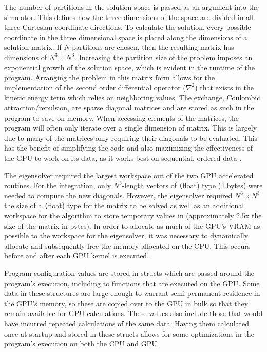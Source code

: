 \documentclass[conference, twoside]{IEEEtran}
\begin{document}
The number of partitions in the solution space is passed as an argument into the simulator. This defines how the three dimensions of the space are divided in all three Cartesian coordinate directions. To calculate the solution, every possible coordinate in the three dimensional space is placed along the dimensions of a solution matrix. If $N$ partitions are chosen, then the resulting matrix has dimensions of $N^3 \times N^3$. Increasing the partition size of the problem imposes an exponential growth of the solution space, which is evident in the runtime of the program. Arranging the problem in this matrix form allows for the implementation of the second order differential operator ($\nabla^2$) that exists in the kinetic energy term which relies on neighboring values. The exchange, Coulombic attraction/repulsion, are sparse diagonal matrices and are stored as such in the program to save on memory. When accessing elements of the matrices, the program will often only iterate over a single dimension of matrix. This is largely due to many of the matrices only requiring their diagonals to be evaluated. This has the benefit of simplifying the code and also maximizing the effectiveness of the GPU to work on its data, as it works best on sequential, ordered data \cite{special-purpose-hf-computer}.

The eigensolver required the largest workspace out of the two GPU accelerated routines. For the integration, only $N^3$-length vectors of \texttt(float) type (4 bytes) were needed to compute the new diagonals. However, the eigensolver required $N^3 \times N^3$ the size of a \texttt(float) type for the matrix to be solved as well as an additional workspace for the algorithm to store temporary values in (approximately 2.5x the size of the matrix in bytes). In order to allocate as much of the GPU's VRAM as possible to the workspace for the eigensolver, it was necessary to dynamically allocate and subsequently free the memory allocated on the CPU. This occurs before and after each GPU kernel is executed.

Program configuration values are stored in structs which are passed around the program's execution, including to functions that are executed on the GPU. Some data in these structures are large enough to warrant semi-permanent residence in the GPU's memory, so these are copied over to the GPU in bulk so that they remain available for GPU calculations. These values also include those that would have incurred repeated calculations of the same data. Having them calculated once at startup and stored in these structs allows for some optimizations in the program's execution on both the CPU and GPU.
\end{document}
